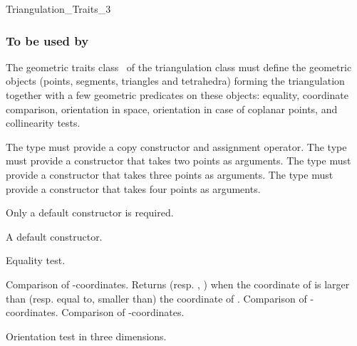 	\begin{ccClass}{Triangulation_Traits_3}
\subsubsection{To be used by \protect {}}


The geometric traits class \ccClassName\ of the triangulation
class  must define the geometric
objects (points, segments, triangles and tetrahedra) forming the
triangulation together with a few geometric predicates on these objects:
equality, coordinate comparison, orientation in space, orientation
in case of coplanar points, and collinearity tests.

\ccTypes
{}

{The type must provide a copy constructor and assignment operator.}
\ccGlue
{}
{The  type must provide a constructor that takes two points as arguments.}
\ccGlue
{}
{The type must provide a constructor that takes three points as
arguments.}
\ccGlue
{}
{The type must provide a constructor that takes four points as
arguments.}

\ccCreation
{}

Only a default constructor is required.

{A default constructor.}

{Equality test.}

{Comparison of -coordinates. Returns 
(resp. , ) when the 
coordinate of  is larger than (resp. equal to, smaller than)
the  coordinate of .} 
\ccGlue
{}
{Comparison of -coordinates.}
\ccGlue
{}
{Comparison of -coordinates.}

{Orientation test in three dimensions.}


\end{ccClass}
